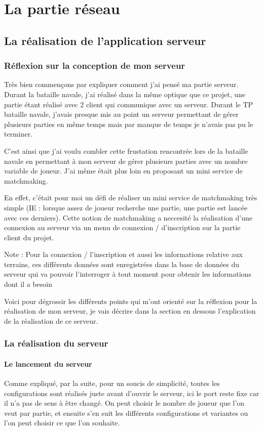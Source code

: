\documentclass[12pt, openany]{report}
\begin{document}
\part{La partie réseau}
  \chapter{La réalisation de l'application serveur}
    \section{Réflexion sur la conception de mon serveur}
    Très bien commençons par expliquer comment j'ai pensé ma partie serveur. Durant la bataille navale, j'ai réalisé dans la même optique que ce projet, une partie étant réalisé avec 2 client qui communique avec un serveur. Durant le TP bataille navale, j'avais presque mis au point un serveur permettant de gérer plusieurs parties en même temps mais par manque de temps je n'avais pas pu le terminer.

C'est ainsi que j'ai voulu combler cette frustation rencontrée lors de la bataille navale en permettant à mon serveur de gérer plusieurs parties avec un nombre variable de joueur. J'ai même était plus loin en proposant un mini service de matchmaking.

En effet, c'était pour moi un défi de réaliser un mini service de matchmaking très simple (IE : lorsque assez de joueur recherche une partie, une partie est lancée avec ces derniers). Cette notion de matchmaking a neccesité la réalisation d'une connexion au serveur via un menu de connexion / d'inscription sur la partie client du projet.

Note : Pour la connexion / l'inscription et aussi les informations relative aux terrains, ces différents données sont enregistrées dans la base de données du serveur qui va pouvoir l'interroger à tout moment pour obtenir les informations dont il a besoin

Voici pour dégrossir les différents points qui m'ont orienté sur la réflexion pour la réalisation de mon serveur, je vais décrire dans la section en dessous l'explication de la réalisation de ce serveur.
    
    \section{La réalisation du serveur}
	\subsection{Le lancement du serveur}
	Comme expliqué, par la suite, pour un soucis de simplicité, toutes les configurations sont réalisés juste avant d'ouvrir le serveur, ici le port reste fixe car il n'a pas de sens à être changé. On peut choisir le nombre de joueur que l'on veut par partie, et ensuite s'en suit les différents configurations et variantes ou l'on peut choisir ce que l'on souhaite.
	
\end{document}

